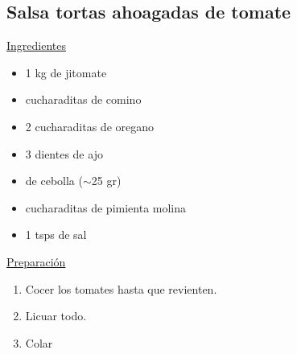 \subsection{Salsa tortas ahoagadas de tomate}

\underline{Ingredientes}
\begin{itemize}
\item 1 kg de jitomate
\item {} cucharaditas de comino
\item 2 cucharaditas de oregano
\item 3 dientes de ajo
\item {} de cebolla ($\sim$25 gr)
\item {} cucharaditas de pimienta molina
\item 1 tsps de sal
\end{itemize}

\underline{Preparaci\'on}
\begin{enumerate}
\item Cocer los tomates hasta que revienten.
\item Licuar todo.
\item Colar
\end{enumerate}
